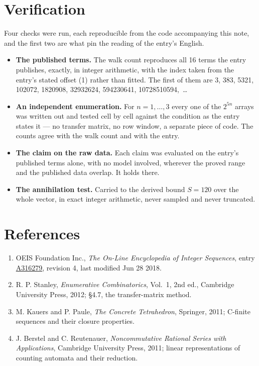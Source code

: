 \documentclass[11pt]{article}
\theoremstyle{definition}
\begin{document}
\section{Verification}

Four checks were run, each reproducible from the code accompanying this note, and the first two are what pin the reading of the entry's English.

\begin{itemize}

\item {\bfseries The published terms.} The walk count reproduces all 16 terms the entry publishes, exactly, in integer arithmetic, with the index taken from the entry's stated offset (1) rather than fitted. The first of them are 3, 383, 5321, 102072, 1820908, 32932624, 594230641, 10728510594,~\dots

\item {\bfseries An independent enumeration.} For $n = 1,\dots,3$ every one of the $2^{5n}$ arrays was written out and tested cell by cell against the condition as the entry states it --- no transfer matrix, no row window, a separate piece of code. The counts agree with the walk count and with the entry.

\item {\bfseries The claim on the raw data.} Each claim was evaluated on the entry's published terms alone, with no model involved, wherever the proved range and the published data overlap. It holds there.

\item {\bfseries The annihilation test.} Carried to the derived bound $S = 120$ over the whole vector, in exact integer arithmetic, never sampled and never truncated.

\end{itemize}

\section{References}

\begin{enumerate}

\item OEIS Foundation Inc., \emph{The On-Line Encyclopedia of Integer Sequences}, entry \href{https://oeis.org/A316279}{A316279}, revision 4, last modified Jun 28 2018.

\item R. P. Stanley, \emph{Enumerative Combinatorics}, Vol.~1, 2nd ed., Cambridge University Press, 2012; \S4.7, the transfer-matrix method.

\item M. Kauers and P. Paule, \emph{The Concrete Tetrahedron}, Springer, 2011; C-finite sequences and their closure properties.

\item J. Berstel and C. Reutenauer, \emph{Noncommutative Rational Series with Applications}, Cambridge University Press, 2011; linear representations of counting automata and their reduction.

\end{enumerate}
\end{document}
